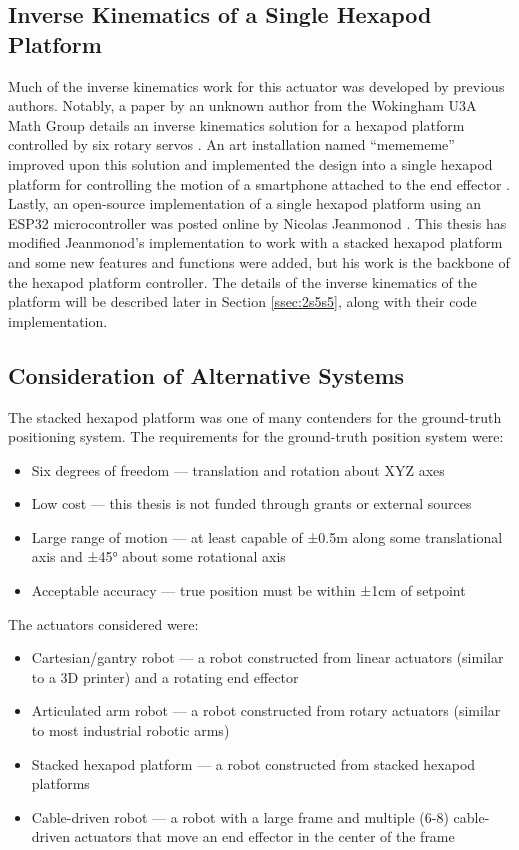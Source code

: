 \documentclass[11pt]{ucthesisCP}
\begin{document}
\subsection{Inverse Kinematics of a Single Hexapod Platform} \label{ssec:2s1s3}
Much of the inverse kinematics work for this actuator was developed by previous authors. Notably, a paper by an unknown author from the Wokingham U3A Math Group details an inverse kinematics solution for a hexapod platform controlled by six rotary servos \cite{wokingham}. An art installation named “memememe” improved upon this solution and implemented the design into a single hexapod platform for controlling the motion of a smartphone attached to the end effector \cite{meme}. Lastly, an open-source implementation of a single hexapod platform using an ESP32 microcontroller was posted online by Nicolas Jeanmonod \cite{nicdoc} \cite{nichub}. This thesis has modified Jeanmonod’s implementation to work with a stacked hexapod platform and some new features and functions were added, but his work is the backbone of the hexapod platform controller. The details of the inverse kinematics of the platform will be described later in Section \ref{ssec:2s5s5}, along with their code implementation.

\subsection{Consideration of Alternative Systems} \label{ssec:2s1s4}
The stacked hexapod platform was one of many contenders for the ground-truth positioning system. The requirements for the ground-truth position system were:

\begin{itemize}[noitemsep,topsep=0pt]
	\item Six degrees of freedom --- translation and rotation about XYZ axes
	\item Low cost --- this thesis is not funded through grants or external sources
	\item Large range of motion --- at least capable of ±0.5m along some translational axis and ±45° about some rotational axis
	\item Acceptable accuracy --- true position must be within ±1cm of setpoint
\end{itemize}

\vspace{2ex}
\noindent The actuators considered were:

\begin{itemize}[noitemsep,topsep=0pt]
	\item Cartesian/gantry robot --- a robot constructed from linear actuators (similar to a 3D printer) and a rotating end effector
	\item Articulated arm robot --- a robot constructed from rotary actuators (similar to most industrial robotic arms)
	\item Stacked hexapod platform --- a robot constructed from stacked hexapod platforms
	\item Cable-driven robot --- a robot with a large frame and multiple (6-8) cable-driven actuators that move an end effector in the center of the frame
\end{itemize}
\end{document}
